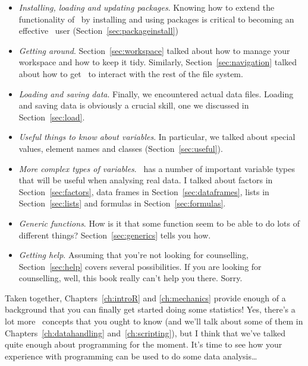 \begin{itemize}
\item {\it Installing, loading and updating packages}. Knowing how to extend the functionality of \R\ by installing and using packages is critical to becoming an effective \R\ user (Section~\ref{sec:packageinstall})
\item {\it Getting around}. Section~\ref{sec:workspace} talked about how to manage your workspace and how to keep it tidy. Similarly, Section~\ref{sec:navigation} talked about how to get \R\ to interact with the rest of the file system.
\item {\it Loading and saving data}. Finally, we encountered actual data files. Loading and saving data is obviously a crucial skill, one we discussed in Section~\ref{sec:load}.
\item {\it Useful things to know about variables}. In particular, we talked about special values, element names and classes (Section~\ref{sec:useful}).
\item {\it More complex types of variables}. \R\ has a number of important variable types that will be useful when analysing real data. I talked about factors in Section~\ref{sec:factors}, data frames in Section~\ref{sec:dataframes}, lists in Section~\ref{sec:lists} and formulas in Section~\ref{sec:formulas}.
\item {\it Generic functions}. How is it that some function seem to be able to do lots of different things? Section~\ref{sec:generics} tells you how.
\item {\it Getting help}. Assuming that you're not looking for counselling, Section~\ref{sec:help} covers several possibilities. If you are looking for counselling, well, this book really can't help you there. Sorry. 
\end{itemize}

\noindent
Taken together, Chapters~\ref{ch:introR} and \ref{ch:mechanics} provide enough of a background that you can finally get started doing some statistics! Yes, there's a lot more \R\ concepts that you ought to know (and we'll talk about some of them in Chapters~\ref{ch:datahandling} and~\ref{ch:scripting}), but I think that we've talked quite enough about programming for the moment. It's time to see how your experience with programming can be used to do some data analysis\ldots


